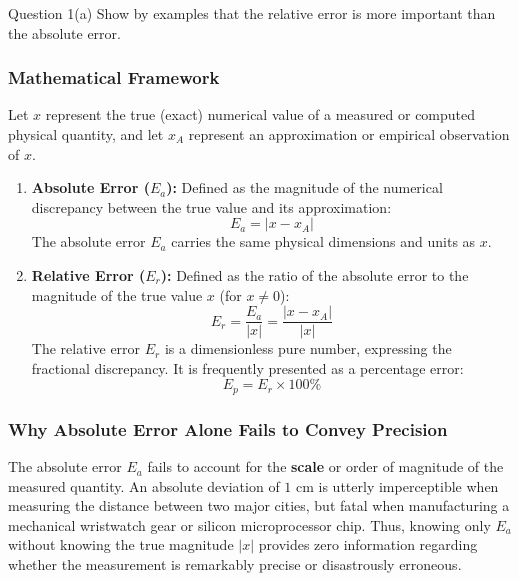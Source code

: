 \documentclass[11pt,a4paper]{article}
\newcommand{\abs}[1]{\left\lvert#1\right\rvert}
\begin{document}
\begin{questionbox}{Question 1(a)}
Show by examples that the relative error is more important than the absolute error.
\end{questionbox}

\subsubsection*{Mathematical Framework}
Let $x$ represent the true (exact) numerical value of a measured or computed physical quantity, and let $x_A$ represent an approximation or empirical observation of $x$.

\begin{enumerate}[leftmargin=*]
    \item \textbf{Absolute Error ($E_a$):} Defined as the magnitude of the numerical discrepancy between the true value and its approximation:
    \begin{equation}
        E_a = \abs{x - x_A}
    \end{equation}
    The absolute error $E_a$ carries the same physical dimensions and units as $x$.

    \item \textbf{Relative Error ($E_r$):} Defined as the ratio of the absolute error to the magnitude of the true value $x$ (for $x \neq 0$):
    \begin{equation}
        E_r = \frac{E_a}{\abs{x}} = \frac{\abs{x - x_A}}{\abs{x}}
    \end{equation}
    The relative error $E_r$ is a dimensionless pure number, expressing the fractional discrepancy. It is frequently presented as a percentage error:
    \begin{equation}
        E_p = E_r \times 100\%
    \end{equation}
\end{enumerate}

\subsubsection*{Why Absolute Error Alone Fails to Convey Precision}
The absolute error $E_a$ fails to account for the \textbf{scale} or order of magnitude of the measured quantity. An absolute deviation of $1\text{ cm}$ is utterly imperceptible when measuring the distance between two major cities, but fatal when manufacturing a mechanical wristwatch gear or silicon microprocessor chip. Thus, knowing only $E_a$ without knowing the true magnitude $\abs{x}$ provides zero information regarding whether the measurement is remarkably precise or disastrously erroneous.
\end{document}
